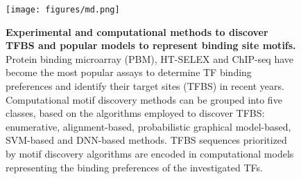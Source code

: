 \documentclass[a4paper, titlepage, openright]{book}
\begin{document}
\begin{figure}
	\centering
	\texttt{[image: figures/md.png]}
	\caption[Experimental and computational methods to discover TFBS and popular models to represent binding site motifs.]{\textbf{Experimental and computational methods to discover TFBS and popular models to represent binding site motifs.} Protein binding microarray (PBM), HT-SELEX and ChIP-seq have become the most popular assays to determine TF binding preferences and identify their target sites (TFBS) in recent years. Computational motif discovery methods can be grouped into five classes, based on the algorithms employed to discover TFBS: enumerative, alignment-based, probabilistic graphical model-based, SVM-based and DNN-based methods. TFBS sequences prioritized by motif discovery algorithms are encoded in computational models representing the binding preferences of the investigated TFs.}
	\label{fig:md}
\end{figure}
\end{document}
